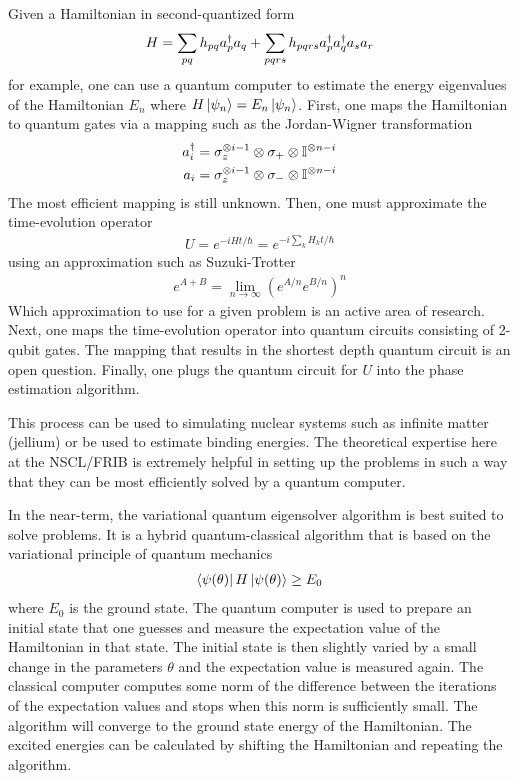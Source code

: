 \documentclass[10pt]{article}
\newcommand{\dagg}[1]{\ensuremath #1^\dag}
\begin{document}
Given a Hamiltonian in second-quantized form
\begin{align*}
H=\sum_{pq}h_{pq}\dagg{a_p}a_q+\sum_{pqrs}h_{pqrs}\dagg{a_p}\dagg{a_q}a_sa_r
\end{align*}
for example, one can use a quantum computer to estimate the energy eigenvalues of the Hamiltonian $E_n$ where $H\ket{\psi_n}=E_n\ket{\psi_n}$. First, one maps the Hamiltonian to quantum gates via a mapping such as the Jordan-Wigner transformation
\begin{align*}
\dagg{a_i}&=\sigma_z^{\otimes i-1}\otimes\sigma_+\otimes\mathbb{I}^{\otimes n-i} \\
\nonumber
a_i&=\sigma_z^{\otimes i-1}\otimes\sigma_-\otimes\mathbb{I}^{\otimes n-i}
\end{align*}
The most efficient mapping is still unknown.
Then, one must approximate the time-evolution operator
\begin{align*}
U=e^{-iHt/\hbar}=e^{-i\sum_kH_kt/\hbar}
\end{align*}
using an approximation such as Suzuki-Trotter
\begin{align*}
e^{A+B}=\lim_{n\to\infty}\left(e^{A/n}e^{B/n}\right)^n
\end{align*}
Which approximation to use for a given problem is an active area of research.
Next, one maps the time-evolution operator into quantum circuits consisting of 2-qubit gates. The mapping that results in the shortest depth quantum circuit is an open question. Finally, one plugs the quantum circuit for $U$ into the phase estimation algorithm.

This process can be used to simulating nuclear systems such as infinite matter (jellium) or be used to estimate binding energies. The theoretical expertise here at the NSCL/FRIB is extremely helpful in setting up the problems in such a way that they can be most efficiently solved by a quantum computer.

In the near-term, the variational quantum eigensolver algorithm is best suited to solve problems. It is a hybrid quantum-classical algorithm that is based on the variational principle of quantum mechanics
\begin{align*}
\bra{\psi(\theta)}H\ket{\psi(\theta)}\geq E_0
\end{align*}
where $E_0$ is the ground state. The quantum computer is used to prepare an initial state that one guesses and measure the expectation value of the Hamiltonian in that state. The initial state is then slightly varied by a small change in the parameters $\theta$ and the expectation value is measured again. The classical computer computes some norm of the difference between the iterations of the expectation values and stops when this norm is sufficiently small. The algorithm will converge to the ground state energy of the Hamiltonian. The excited energies can be calculated by shifting the Hamiltonian and repeating the algorithm.
\end{document}
